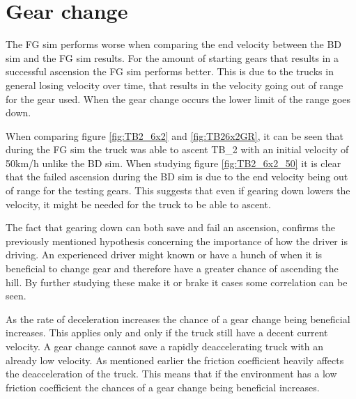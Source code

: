 \documentclass[noprint]{uit-thesis}
\begin{document}
\section{Gear change}
The FG sim performs worse when comparing the end velocity between the BD sim and the FG sim results. For the amount of starting gears that results in a successful ascension the FG sim performs better. This is due to the trucks in general losing velocity over time, that results in the velocity going out of range for the gear used. When the gear change occurs the lower limit of the range goes down.
\par
When comparing figure \ref{fig:TB2_6x2} and \ref{fig:TB26x2GR}, it can be seen that during the FG sim the truck was able to ascent TB\_2 with an initial velocity of 50km/h unlike the BD sim. When studying figure \ref{fig:TB2_6x2_50} it is clear that the failed ascension during the BD sim is due to the end velocity being out of range for the testing gears. This suggests that even if gearing down lowers the velocity, it might be needed for the truck to be able to ascent. 
\par
The fact that gearing down can both save and fail an ascension, confirms the previously mentioned hypothesis concerning the importance of how the driver is driving. An experienced driver might known or have a hunch of when it is beneficial to change gear and therefore have a greater chance of ascending the hill. By further studying these make it or brake it cases some correlation can be seen. 
\par
As the rate of deceleration increases the chance of a gear change being beneficial increases. This applies only and only if the truck still have a decent current velocity. A gear change cannot save a rapidly deaccelerating truck with an already low velocity. As mentioned earlier the friction coefficient heavily affects the deacceleration of the truck. This means that if the environment has a low friction coefficient the chances of a gear change being beneficial increases. 
\end{document}
